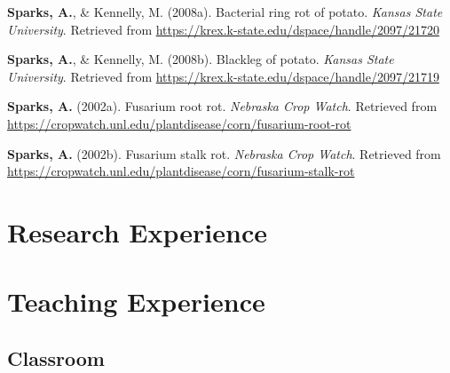 \documentclass[11pt, a4paper]{awesome-cv}
\begin{document}
\leavevmode\hypertarget{ref-Sparks2008a}{}%
\textbf{Sparks, A.}, \& Kennelly, M. (2008a). Bacterial ring rot of
potato. \emph{Kansas State University}. Retrieved from
\url{https://krex.k-state.edu/dspace/handle/2097/21720}

\leavevmode\hypertarget{ref-Sparks2008b}{}%
\textbf{Sparks, A.}, \& Kennelly, M. (2008b). Blackleg of potato.
\emph{Kansas State University}. Retrieved from
\url{https://krex.k-state.edu/dspace/handle/2097/21719}

\leavevmode\hypertarget{ref-Sparks2002b}{}%
\textbf{Sparks, A.} (2002a). Fusarium root rot. \emph{Nebraska Crop
Watch}. Retrieved from
\url{https://cropwatch.unl.edu/plantdisease/corn/fusarium-root-rot}

\leavevmode\hypertarget{ref-Sparks2002a}{}%
\textbf{Sparks, A.} (2002b). Fusarium stalk rot. \emph{Nebraska Crop
Watch}. Retrieved from
\url{https://cropwatch.unl.edu/plantdisease/corn/fusarium-stalk-rot}

\endgroup

\hypertarget{research-experience}{%
\section{Research Experience}\label{research-experience}}

\begin{cventries}
\end{cventries}

\hypertarget{teaching-experience}{%
\section{Teaching Experience}\label{teaching-experience}}

\hypertarget{classroom}{%
\subsection{Classroom}\label{classroom}}
\end{document}
